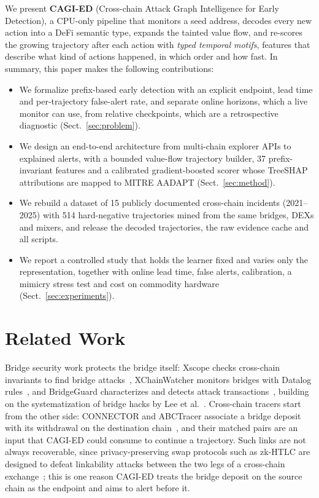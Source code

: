 \documentclass[runningheads]{llncs}
\newcommand{\1}{\mathbb{1}}
\begin{document}
We present \textbf{CAGI-ED} (Cross-chain Attack Graph Intelligence for Early Detection), a CPU-only pipeline that monitors a seed address, decodes every new action into a DeFi semantic type, expands the tainted value flow, and re-scores the growing trajectory after each action with \emph{typed temporal motifs}, features that describe what kind of actions happened, in which order and how fast.
In summary, this paper makes the following contributions:
\begin{itemize}
\item We formalize prefix-based early detection with an explicit endpoint, lead time and per-trajectory false-alert rate, and separate online horizons, which a live monitor can use, from relative checkpoints, which are a retrospective diagnostic (Sect.~\ref{sec:problem}).
\item We design an end-to-end architecture from multi-chain explorer APIs to explained alerts, with a bounded value-flow trajectory builder, 37 prefix-invariant features and a calibrated gradient-boosted scorer whose TreeSHAP attributions are mapped to MITRE AADAPT (Sect.~\ref{sec:method}).
\item We rebuild a dataset of 15 publicly documented cross-chain incidents (2021--2025) with 514 hard-negative trajectories mined from the same bridges, DEXs and mixers, and release the decoded trajectories, the raw evidence cache and all scripts.
\item We report a controlled study that holds the learner fixed and varies only the representation, together with online lead time, false alerts, calibration, a mimicry stress test and cost on commodity hardware (Sect.~\ref{sec:experiments}).
\end{itemize}

\section{Related Work}
\label{sec:related}

Bridge security work protects the bridge itself: Xscope checks cross-chain invariants to find bridge attacks~\cite{zhang2022xscope}, XChainWatcher monitors bridges with Datalog rules~\cite{augusto2025xchainwatcher}, and BridgeGuard characterizes and detects attack transactions~\cite{wu2025safeguarding}, building on the systematization of bridge hacks by Lee et al.~\cite{lee2023sok}.
Cross-chain tracers start from the other side: CONNECTOR and ABCTracer associate a bridge deposit with its withdrawal on the destination chain~\cite{lin2025connector,lin2025abctracer}, and their matched pairs are an input that CAGI-ED could consume to continue a trajectory.
Such links are not always recoverable, since privacy-preserving swap protocols such as zk-HTLC are designed to defeat linkability attacks between the two legs of a cross-chain exchange~\cite{tran2026zkhtlc}; this is one reason CAGI-ED treats the bridge deposit on the source chain as the endpoint and aims to alert before it.
\end{document}
